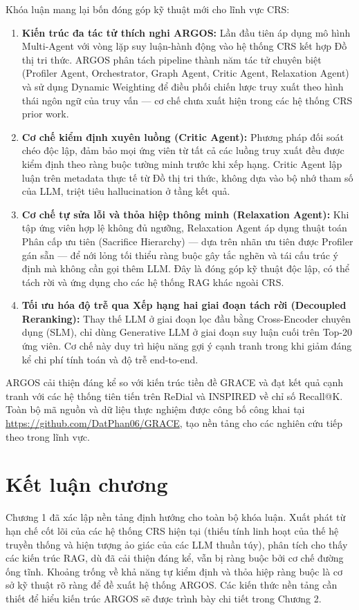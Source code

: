 Khóa luận mang lại bốn đóng góp kỹ thuật mới cho lĩnh vực CRS:
\begin{enumerate}
    \item \textbf{Kiến trúc đa tác tử thích nghi ARGOS:} Lần đầu tiên áp dụng mô hình Multi-Agent với vòng lặp suy luận-hành động vào hệ thống CRS kết hợp Đồ thị tri thức. ARGOS phân tách pipeline thành năm tác tử chuyên biệt (Profiler Agent, Orchestrator, Graph Agent, Critic Agent, Relaxation Agent) và sử dụng Dynamic Weighting để điều phối chiến lược truy xuất theo hình thái ngôn ngữ của truy vấn — cơ chế chưa xuất hiện trong các hệ thống CRS prior work.
    \item \textbf{Cơ chế kiểm định xuyên luồng (Critic Agent):} Phương pháp đối soát chéo độc lập, đảm bảo mọi ứng viên từ tất cả các luồng truy xuất đều được kiểm định theo ràng buộc tường minh trước khi xếp hạng. Critic Agent lập luận trên metadata thực tế từ Đồ thị tri thức, không dựa vào bộ nhớ tham số của LLM, triệt tiêu hallucination ở tầng kết quả.
    \item \textbf{Cơ chế tự sửa lỗi và thỏa hiệp thông minh (Relaxation Agent):} Khi tập ứng viên hợp lệ không đủ ngưỡng, Relaxation Agent áp dụng thuật toán Phân cấp ưu tiên (Sacrifice Hierarchy) — dựa trên nhãn ưu tiên được Profiler gán sẵn — để nới lỏng tối thiểu ràng buộc gây tắc nghẽn và tái cấu trúc ý định mà không cần gọi thêm LLM. Đây là đóng góp kỹ thuật độc lập, có thể tách rời và ứng dụng cho các hệ thống RAG khác ngoài CRS.
    \item \textbf{Tối ưu hóa độ trễ qua Xếp hạng hai giai đoạn tách rời (Decoupled Reranking):} Thay thế LLM ở giai đoạn lọc đầu bằng Cross-Encoder chuyên dụng (SLM), chỉ dùng Generative LLM ở giai đoạn suy luận cuối trên Top-20 ứng viên. Cơ chế này duy trì hiệu năng gợi ý cạnh tranh trong khi giảm đáng kể chi phí tính toán và độ trễ end-to-end.
\end{enumerate}

ARGOS cải thiện đáng kể so với kiến trúc tiền đề GRACE và đạt kết quả cạnh tranh với các hệ thống tiên tiến trên ReDial và INSPIRED về chỉ số Recall@K. Toàn bộ mã nguồn và dữ liệu thực nghiệm được công bố công khai tại \url{https://github.com/DatPhan06/GRACE}, tạo nền tảng cho các nghiên cứu tiếp theo trong lĩnh vực.

\section*{Kết luận chương}

Chương 1 đã xác lập nền tảng định hướng cho toàn bộ khóa luận. Xuất phát từ hạn chế cốt lõi của các hệ thống CRS hiện tại (thiếu tính linh hoạt của thế hệ truyền thống và hiện tượng ảo giác của các LLM thuần túy), phân tích cho thấy các kiến trúc RAG, dù đã cải thiện đáng kể, vẫn bị ràng buộc bởi cơ chế đường ống tĩnh. Khoảng trống về khả năng tự kiểm định và thỏa hiệp ràng buộc là cơ sở kỹ thuật rõ ràng để đề xuất hệ thống ARGOS. Các kiến thức nền tảng cần thiết để hiểu kiến trúc ARGOS sẽ được trình bày chi tiết trong Chương 2.
